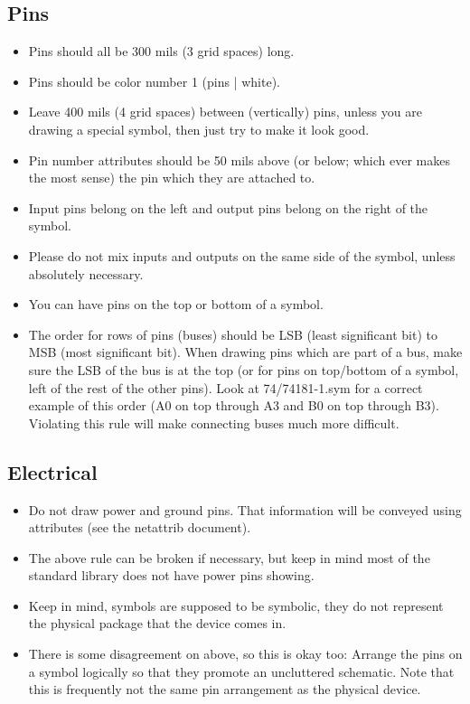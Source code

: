 \documentclass{article}
\begin{document}
\subsection{Pins}

\begin{itemize}
\item Pins should all be 300 mils (3 grid spaces) long.
\item Pins should be color number 1 (pins | white).
\item Leave 400 mils (4 grid spaces) between (vertically) pins, unless
      you are drawing a special symbol, then just try to make it look
      good.
\item Pin number attributes should be 50 mils above (or below; which
      ever makes the most sense) the pin which they are attached to.
\item Input pins belong on the left and output pins belong on the right of 
      the symbol.
\item Please do not mix inputs and outputs on the same side of the symbol,
      unless absolutely necessary. 
\item You can have pins on the top or bottom of a symbol.
\item The order for rows of pins (buses) should be LSB (least significant
      bit) to MSB (most significant bit).  When drawing pins which
      are part of a bus, make sure the LSB of the bus is at the top
      (or for pins on top/bottom of a symbol, left of the rest of
      the other pins).  Look at 74/74181-1.sym for a correct example
      of this order (A0 on top through A3 and B0 on top through B3).
      Violating this rule will make connecting buses much more difficult.

\end{itemize}

\subsection{Electrical}

\begin{itemize}
\item Do not draw power and ground pins.  That information will be
      conveyed using attributes (see the netattrib document).
\item The above rule can be broken if necessary, but keep in mind most of
      the standard library does not have power pins showing.
\item Keep in mind, symbols are supposed to be symbolic, they do not represent
      the physical package that the device comes in.  
\item There is some disagreement on above, so this is okay too: Arrange
      the pins on a symbol logically so that they promote an uncluttered
      schematic.  Note that this is frequently not the same pin
      arrangement as the physical device.
\end{itemize}
\end{document}
